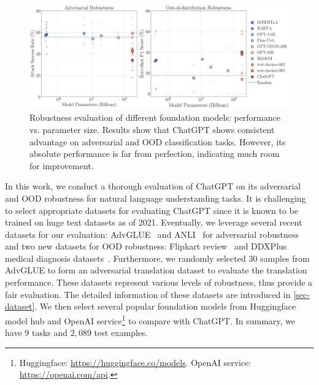 \documentclass[11pt]{article}
\newcommand{\chat}{ChatGPT\xspace}
\newcommand{\advglue}{AdvGLUE\xspace}
\newcommand{\flip}{Flipkart\xspace}
\newcommand{\ddx}{DDXPlus\xspace}
\begin{document}
\begin{figure}[t!]
    \centering
    \includegraphics[width=\textwidth]{submissions/submission4/figures/model_acc_param.pdf}
    \caption{Robustness evaluation of different foundation models: performance vs. parameter size. Results show that \chat shows consistent advantage on adversarial and OOD classification tasks. However, its absolute performance is far from perfection, indicating much room for improvement.}
    \label{fig-summary}
\end{figure}

In this work, we conduct a thorough evaluation of \chat on its adversarial and OOD robustness for natural language understanding tasks.
It is challenging to select appropriate datasets for evaluating 
 \chat since it is known to be trained on huge text datasets as of 2021.
Eventually, we leverage several recent datasets for our evaluation: \advglue~\cite{wang2021adversarial} and ANLI~\cite{nie2019adversarial} for adversarial robustness and two new datasets for OOD robustness: \flip review~\cite{flipkart_2023} and \ddx medical diagnosis datasets~\cite{tchango2022ddxplus}.
Furthermore, we randomly selected $30$ samples from \advglue to form an adversarial translation dataset to evaluate the translation performance.
These datasets represent various levels of robustness, thus provide a fair evaluation.
The detailed information of these datasets are introduced in \cref{sec-dataset}.
We then select several popular foundation models from Huggingface model hub and OpenAI service\footnote{Huggingface: \url{https://huggingface.co/models}. OpenAI service: \url{https://openai.com/api}.} to compare with \chat.
In summary, we have $9$ tasks and $2,089$ test examples.
\end{document}

